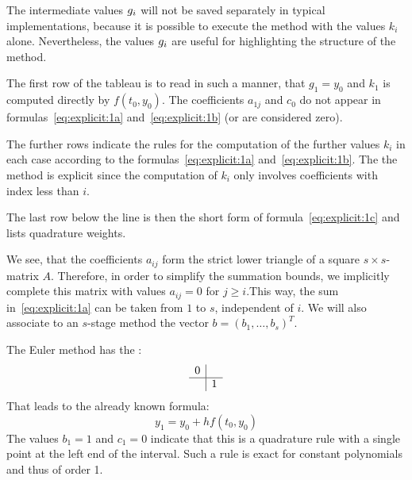 \begin{remark}
  The intermediate values $g_i$ will not be saved separately in
  typical implementations, because it is possible to execute the
  method with the values $k_i$ alone. Nevertheless, the values
  $g_i$ are useful for highlighting the structure of the method.
\end{remark}



\begin{remark}
  The first row of the tableau is to read in such a manner, that
  $g_1 = y_0$ and $k_1$ is computed directly by $f(t_0, y_0)$. The
  coefficients $a_{1j}$ and $c_0$ do not appear in formulas~\eqref{eq:explicit:1a}
  and~\eqref{eq:explicit:1b} (or are considered zero).
  
  The further rows indicate the rules for the computation of the
  further values $k_i$ in each case according to the
  formulas~\eqref{eq:explicit:1a} and~\eqref{eq:explicit:1b}. The
  the method is explicit since the computation of $k_i$ only involves
  coefficients with index less than $i$.
  
  The last row below the line is then the short form of
  formula~\eqref{eq:explicit:1c} and lists quadrature weights.

  We see, that the coefficients $a_{ij}$ form the strict lower
  triangle of a square $s\times s$-matrix $A$. Therefore, in order to
  simplify the summation bounds, we implicitly complete this matrix
  with values $a_{ij} = 0$ for $j\ge i$.This way, the sum
  in~\eqref{eq:explicit:1a} can be taken from $1$ to $s$, independent
  of $i$. We will also associate to an $s$-stage method the vector $b
  = (b_1,\dots,b_s)^T$.
\end{remark}

\begin{example}
  The Euler method  has the :
  \begin{gather*}
    \begin{array}{c|c}
      0 & \\
      \hline
        & 1 \\
    \end{array}
  \end{gather*}
  That leads to the already known formula:
  \begin{equation*}
    y_1 = y_0 + h f(t_0, y_0)
  \end{equation*}
  The values $b_1=1$ and $c_1=0$ indicate that this is a quadrature
  rule with a single point at the left end of the interval. Such a
  rule is exact for constant polynomials and thus of order 1.
\end{example}

